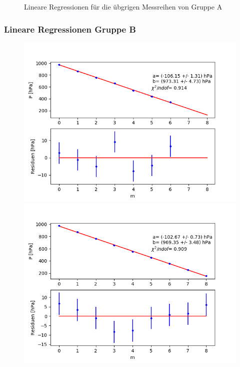 \documentclass[12pt,a4paper]{article}
\begin{document}
\begin{figure}[h]
\caption{Lineare Regressionen für die übgrigen Messreihen von Gruppe A}
\end{figure}

\subsubsection{Lineare Regressionen Gruppe B}
\begin{figure}
\centering
\includegraphics[scale=0.5]{Bilder/Druck_B_Var2_0.png}
\includegraphics[scale=0.5]{Bilder/Druck_B_Var2_1.png}

\end{figure}
\end{document}
